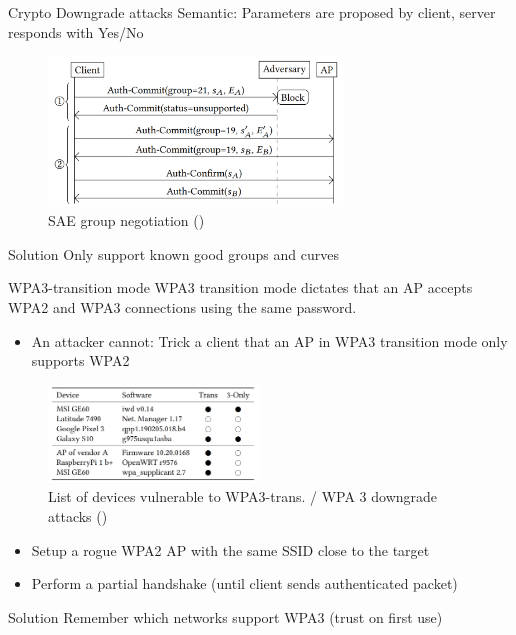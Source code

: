 \documentclass[xcolor=table]{bredelebeamer}
\begin{document}
\begin{frame}{Crypto Downgrade attacks}
    Semantic: Parameters are proposed by client, server responds with Yes/No
    \begin{figure}
        \centering
        \includegraphics[width=0.7\textwidth]{downgrade.png}
        \caption{SAE group negotiation (\cite{vanhoef-sp2020-dragonblood})}
        \label{fig:my_label}
    \end{figure}

    \begin{exampleblock}{Solution}
    Only support known good groups and curves 
    \end{exampleblock}
\end{frame}
\begin{frame}{WPA3-transition mode}
    WPA3 transition mode dictates that an AP accepts WPA2 and WPA3 connections using the same password.
    \begin{itemize}
        \item An attacker cannot: Trick a client that an AP in WPA3 transition mode only supports WPA2
    \end{itemize}
   \begin{figure}
       \centering
       \includegraphics[width=0.5\textwidth]{wpa3_downgrade.png}
       \caption{List of devices vulnerable to WPA3-trans. / WPA 3 downgrade attacks (\cite{vanhoef-sp2020-dragonblood})}
       \label{fig:my_label}
   \end{figure}
    \begin{itemize}
        \item Setup a rogue WPA2 AP with the same SSID close to the target
        \item Perform a partial handshake (until client sends authenticated packet)
    \end{itemize}
    \begin{exampleblock}{Solution}
    Remember which networks support WPA3 (trust on first use)
    \end{exampleblock}
\end{frame}
\end{document}
